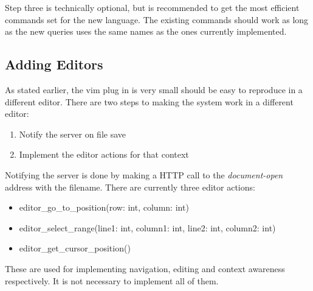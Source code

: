 \documentclass[../thesis.tex]{subfiles}
\begin{document}
Step three is technically optional, but is recommended to get the most efficient commands set for the new language.
The existing commands should work as long as the new queries uses the same names as the ones currently implemented.

\subsection{Adding Editors}%
\label{sec:adding_editors}
As stated earlier, the vim plug in is very small should be easy to reproduce in a different editor.
There are two steps to making the system work in a different editor:
\begin{enumerate}
    \item Notify the server on file save
    \item Implement the editor actions for that context
\end{enumerate}
Notifying the server is done by making a HTTP call to the \textit{document-open} address with the filename.
There are currently three editor actions:
\begin{itemize}
    \item editor\_go\_to\_position(row: int, column: int)
    \item editor\_select\_range(line1: int, column1: int, line2: int, column2: int)
    \item editor\_get\_cursor\_position()
\end{itemize}
These are used for implementing navigation, editing and context awareness respectively.
It is not necessary to implement all of them.
\end{document}
